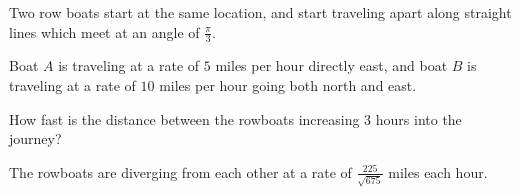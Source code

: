 \documentclass{ximera}
\author{Steven Gubkin}
\begin{document}
\begin{exercise}




        	Two row boats start at the same location, and start traveling apart along straight lines which meet at an angle of $\frac{\pi}{3}$.

        	Boat $A$ is traveling at a rate of $5$ miles per hour directly east, and boat $B$ is traveling at a rate of $10$ miles per hour going both north and east.

	How fast is the distance between the rowboats increasing $3$ hours into the journey? 

\begin{prompt}
	The rowboats are diverging from each other at a rate of $\frac{225}{\sqrt{675}}$ miles each hour.
\end{prompt}

\end{exercise}
\end{document}
